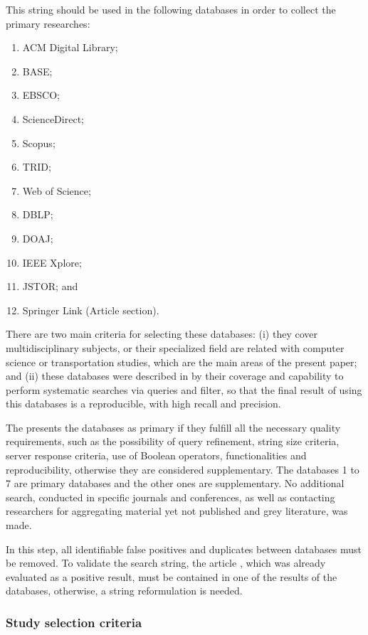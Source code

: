 This string should be used in the following databases in order to collect the primary researches:
\begin{enumerate}
    \item ACM Digital Library;
    \item \acrfull{BASE};
    \item EBSCO;
    \item ScienceDirect;
    \item Scopus;
    \item \acrfull{TRID};
    \item Web of Science;
    \item \acrfull{DBLP};
    \item \acrfull{DOAJ};
    \item IEEE Xplore;
    \item JSTOR; and
    \item Springer Link (Article section).
\end{enumerate}


There are two main criteria for selecting these databases: (i) they cover multidisciplinary subjects, or their specialized field are related with computer science or transportation studies, which are the main areas of the present paper; and (ii) these databases were described in \cite{kitchenham2007guidelines} by their coverage and capability to perform systematic searches via queries and filter, so that the final result of using this databases is a reproducible, with high recall and precision.  

The \cite{gusenbauer2020academic} presents the databases as primary if they fulfill all the necessary quality requirements, such as the possibility of query refinement, string size criteria, server response criteria, use of Boolean operators, functionalities and reproducibility, otherwise they are considered supplementary. The databases 1 to 7 are primary databases and the other ones are supplementary. No additional search, conducted in specific journals and conferences, as well as contacting researchers for aggregating material yet not published and grey literature, was made.

In this step, all identifiable false positives and duplicates between databases must be removed. To validate the search string, the article \cite{ribeiro2018optimization}, which was already evaluated as a positive result, must be contained in one of the results of the databases, otherwise, a string reformulation is needed.

\subsubsection{Study selection criteria}

